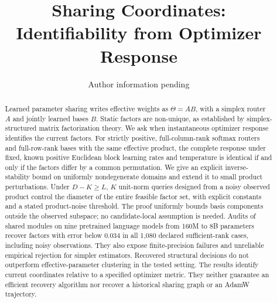 \documentclass{article}
\title{Sharing Coordinates:\\
Identifiability from Optimizer Response}
\author{Author information pending}
\begin{document}
\maketitle
{}

\begin{abstract}
Learned parameter sharing writes effective weights as $\Theta=AB$, with
a simplex router $A$ and jointly learned bases $B$. Static factors are
non-unique, as established by simplex-structured matrix factorization
theory. We ask when instantaneous optimizer response identifies the current
factors. For strictly positive, full-column-rank softmax routers and
full-row-rank bases with the same effective product, the complete response
under fixed, known positive Euclidean block learning rates and temperature
is identical if and only if the factors differ by a common permutation.
We give an explicit inverse-stability bound on uniformly nondegenerate
domains and extend it to small product perturbations. Under $D-K\ge L$,
$K$ unit-norm queries designed from a noisy observed product control the
diameter of the entire feasible factor set, with explicit constants and a
stated product-noise threshold. The proof uniformly bounds basis components
outside the observed subspace; no candidate-local assumption is needed.
Audits of shared modules on nine pretrained language models from 160M to 8B
parameters recover factors with error below $0.034$ in all 1,080 declared
sufficient-rank cases, including noisy observations. They also expose
finite-precision failures and unreliable empirical rejection for simpler
estimators. Recovered structural decisions do not outperform
effective-parameter clustering in the tested setting. The results identify current coordinates relative to
a specified optimizer metric. They neither guarantee an efficient recovery
algorithm nor recover a historical sharing graph or an AdamW trajectory.
\end{abstract}













\appendix













\end{document}
